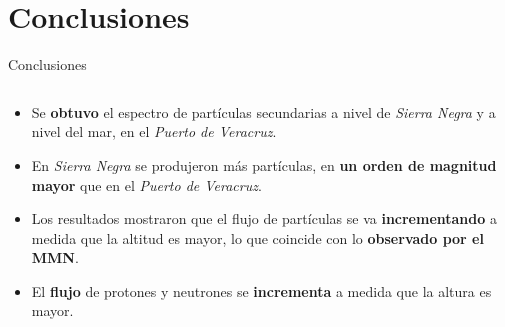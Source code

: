     \section{Conclusiones}
    \begin{frame}{Conclusiones} %
        \justifying %
        \vspace*{-1.5cm} %

        \begin{columns}
            \begin{column}{1.0\textwidth} %
                \begin{itemize}
                    \item Se \textbf{obtuvo} el espectro de partículas secundarias a nivel de \emph{Sierra Negra} y a nivel del mar, en el \emph{Puerto de Veracruz}.\\
                    \item En \emph{Sierra Negra} se produjeron más partículas, en \textbf{un orden de magnitud mayor} que en el \emph{Puerto de Veracruz}. 
                    \item Los resultados mostraron que el flujo de partículas se va \textbf{incrementando} a medida que la altitud es mayor, lo que coincide con lo \textbf{observado por el MMN}.
                    \item El \textbf{flujo} de protones y neutrones se \textbf{incrementa} a medida que la altura es mayor.
                \end{itemize}
            \end{column}
        \end{columns}         
    \end{frame} 

